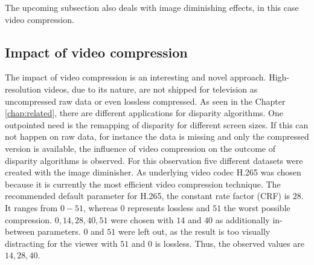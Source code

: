 \noindent The upcoming subsection also deals with image diminishing effects, in this case video compression.

\subsection{Impact of video compression}

The impact of video compression is an interesting and novel approach.
High-resolution videos, due to its nature, are not shipped for television as uncompressed raw data or even lossless compressed.
As seen in the Chapter \ref{chap:related}, there are different applications for disparity algorithms.
One outpointed need is the remapping of disparity for different screen sizes.
If this can not happen on raw data, for instance the data is missing and only the compressed version is available, the influence of video compression on the outcome of disparity algorithms is observed.
\noindent For this observation five different datasets were created with the image diminisher.
As underlying video codec H.265 was chosen because it is currently the most efficient video compression technique.
The recommended default parameter for H.265, the constant rate factor (CRF) is $28$.
It ranges from $0-51$, whereas $0$ represents lossless and $51$ the worst possible compression.
$0, 14, 28, 40, 51$ were chosen with $14$ and $40$ as additionally in-between parameters.
$0$ and $51$ were left out, as the result is too visually distracting for the viewer with $51$ and $0$ is lossless.
Thus, the observed values are $14, 28, 40$.

